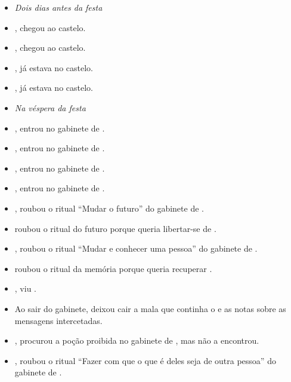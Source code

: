\begin{itemize}
  \item[] \textit{Dois dias antes da festa}

  \item {},  chegou ao castelo.
  \item {},  chegou ao castelo.
  \item {},  já estava no castelo.
  \item {},  já estava no castelo.

  \item[] \textit{Na véspera da festa}

  \item {},  entrou no gabinete de .
  \item {},  entrou no gabinete de .
  \item {},  entrou no gabinete de .
  \item {},  entrou no gabinete de .
  \item {},  roubou o ritual ``Mudar o futuro'' do gabinete de .
  \item {} roubou o ritual do futuro porque queria libertar-se de .
  \item {},  roubou o ritual ``Mudar e conhecer uma pessoa'' do gabinete de .
  \item {} roubou o ritual da memória porque queria recuperar .
  \item {},  viu .
  \item Ao sair do gabinete,  deixou cair a mala que continha o  e as notas sobre as mensagens intercetadas.
  \item {},  procurou a poção proibida no gabinete de , mas não a encontrou.
  \item {},  roubou o ritual ``Fazer com que o que é deles seja de outra pessoa'' do gabinete de .

\end{itemize}

